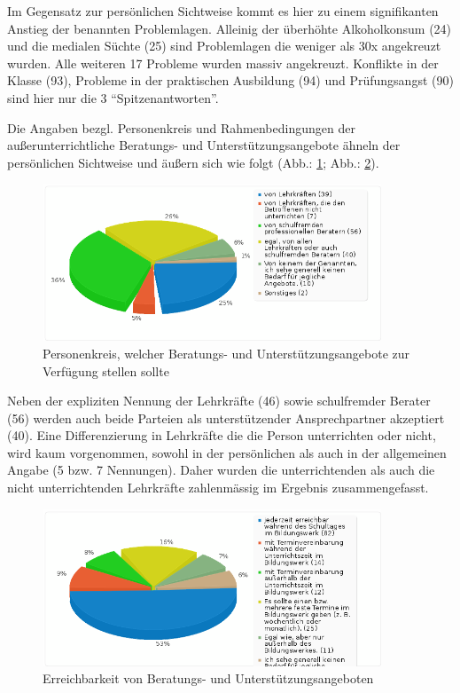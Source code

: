 \noindent
Im Gegensatz zur persönlichen Sichtweise kommt es hier zu einem signifikanten Anstieg der benannten Problemlagen. Alleinig der überhöhte Alkoholkonsum (24) und die medialen Süchte (25) sind Problemlagen die weniger als 30x angekreuzt wurden. Alle weiteren 17 Probleme wurden massiv angekreuzt. Konflikte in der Klasse (93), Probleme in der praktischen Ausbildung (94) und Prüfungsangst (90) sind hier nur die 3 "`Spitzenantworten"'.

Die Angaben bezgl. Personenkreis und Rahmenbedingungen der außerunterrichtliche Beratungs- und Unterstützungsangebote ähneln der persönlichen Sichtweise und äußern sich wie folgt (Abb.: \ref{fig:Personenkreis-fuer-unterstuetzungsangebote}; Abb.: \ref{fig:Erreichbarkeit-von-Beratungs-und-Unterstuetzungangeboten(2)}). 

\begin{figure}[hp]
	\centering
		\includegraphics[width=0.9\textwidth]{images/Personenkreis-fuer-unterstuetzungsangebote.png}
	\caption{Personenkreis, welcher Beratungs- und Unterstützungsangebote zur Verfügung stellen sollte}
	\label{fig:Personenkreis-fuer-unterstuetzungsangebote}
\end{figure}

\noindent
Neben der expliziten Nennung der Lehrkräfte (46) sowie schulfremder Berater (56) werden auch beide Parteien als unterstützender Ansprechpartner akzeptiert (40). Eine Differenzierung in Lehrkräfte die die Person unterrichten oder nicht, wird kaum vorgenommen, sowohl in der persönlichen als auch in der allgemeinen Angabe (5 bzw. 7 Nennungen). Daher wurden die unterrichtenden als auch die nicht unterrichtenden Lehrkräfte zahlenmässig im Ergebnis zusammengefasst.

\begin{figure}
	\centering
		\includegraphics[width=0.9\textwidth]{images/Erreichbarkeit-von-Beratungs-und-Unterstuetzungangeboten(2).png}
	\caption{Erreichbarkeit von Beratungs- und Unterstützungsangeboten}
	\label{fig:Erreichbarkeit-von-Beratungs-und-Unterstuetzungangeboten(2)}
\end{figure}


